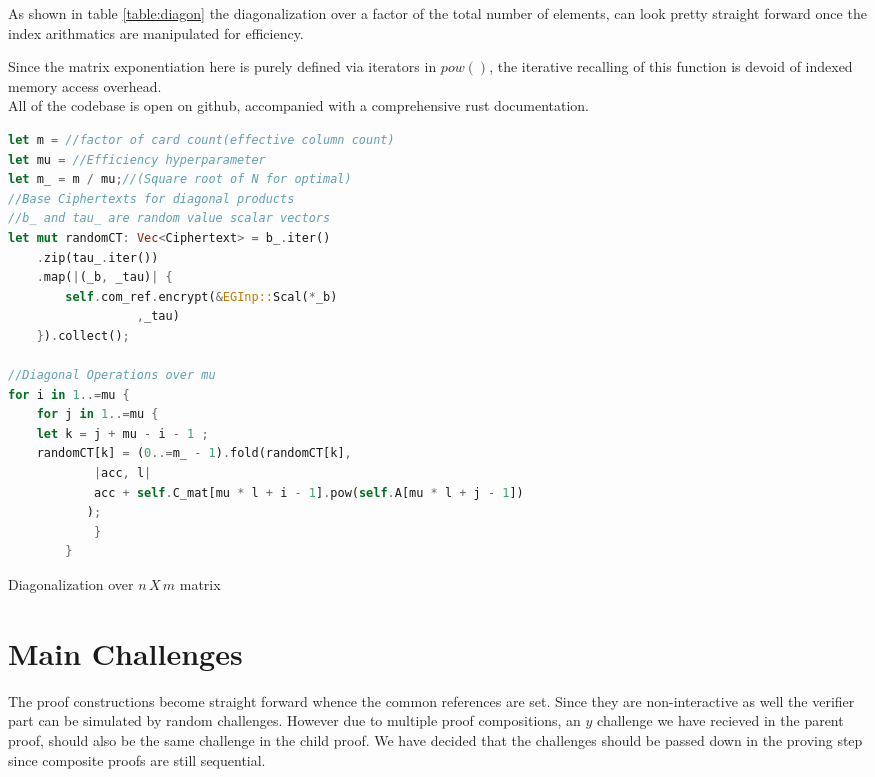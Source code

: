 \documentclass[12pt,a4paper]{report}
\begin{document}
As shown in table \ref{table:diagon} the diagonalization over a factor of the total number of elements,
can look pretty straight forward once the index arithmatics are manipulated for efficiency.

Since the matrix exponentiation here is purely defined via iterators in $pow()$, 
the iterative recalling of this function is devoid of indexed memory access overhead.\\

All of the codebase is open on github\cite{repo}, accompanied with a comprehensive rust documentation.

\begin{table}
\begin{lstlisting}[language=Rust]
let m = //factor of card count(effective column count)
let mu = //Efficiency hyperparameter
let m_ = m / mu;//(Square root of N for optimal)
//Base Ciphertexts for diagonal products
//b_ and tau_ are random value scalar vectors
let mut randomCT: Vec<Ciphertext> = b_.iter()
	.zip(tau_.iter())
	.map(|(_b, _tau)| {
	    self.com_ref.encrypt(&EGInp::Scal(*_b) 
				  ,_tau)
	}).collect();

//Diagonal Operations over mu
for i in 1..=mu {
    for j in 1..=mu {
	let k = j + mu - i - 1 ;
	randomCT[k] = (0..=m_ - 1).fold(randomCT[k],
		    |acc, l|
			acc + self.C_mat[mu * l + i - 1].pow(self.A[mu * l + j - 1])
		   );
            }
        }
\end{lstlisting}
\caption{Diagonalization over $n\,X\,m$ matrix}
\label{table:diagon}
\end{table}

\section{Main Challenges}
The proof constructions become straight forward whence the common references are set. 
Since they are non-interactive as well the verifier part can be simulated by random challenges.
However due to multiple proof compositions, an $y$ challenge we have recieved in the parent proof,
should also be the same challenge in the child proof. We have decided that the challenges should be passed down in the proving step since composite proofs are still sequential.
\end{document}

